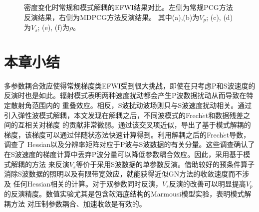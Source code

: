 \begin{figure}
\begin{center}
        \caption{
			密度变化时常规和模式解耦的EFWI结果对比。左侧为常规PCG方法反演结果，右侧为MDPCG方法反演结果。
			其中(a),(b)为$V_p$; (c), (d)为$V_s$; (e), (f)为$\rho$。
		}
    \label{fig:InvertWithRho}
    \end{center}
\end{figure} 

\section{本章小结}
多参数耦合效应使得常规梯度类EFWI受到很大挑战，即使在只考虑P和S波速度的反演时也是如此。辐射模式表明两种速度扰动都会产生P波数据扰动从而导致在特定散射角范围内的
重叠效应。相反，S波扰动波场则只与S波速度扰动相关。通过引入弹性波模式解耦，本文发现在解耦之后，不同波模式的Frech{$\acute{e}$}t和数据残差之间的互相关对梯度
的贡献非常微弱。通过该交叉项近似，导出了基于模式解耦的梯度，该梯度可以通过伴随状态法快速计算得到。利用解耦之后的Frech{$\acute{e}$}t导数，调查了
Hessian以及分辨率矩阵对应于P波与S波数据的有关分量。这些调查确认了在S波速度的梯度计算中丢弃P波分量可以降低参数耦合效应。因此，采用基于模式解耦的方法
来反演$V_s$等价于采用S波数据的单参数反演。借助较好的预条件算子消除S波数据的照明以及有限带宽效应，就能获得近似GN方法的收敛速度而不涉及
任何Hessian相关的计算。对于双参数同时反演，$V_s$反演的改善可以明显提高$V_p$的反演精度。数值实验尤其是包含软海底结构的Marmousi模型实验，表明模式解耦方法
对压制参数耦合、加速收敛是有效的。

